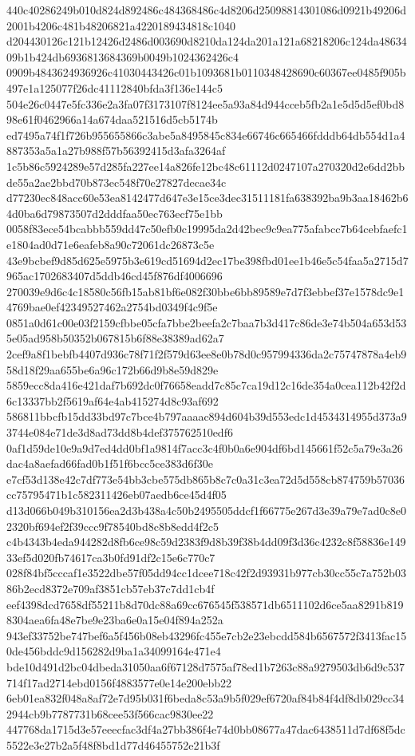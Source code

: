 \documentclass[11pt,a4paper]{article}
\begin{document}
{440c40286249b010d824d892486c484368486c4d8206d25098814301086d0921b49206d2001b4206c481b48206821a4220189434818c1040
d204430126c121b12426d2486d003690d8210da124da201a121a68218206c124da4863409b1b424db6936813684369b0049b1024362426c4
0909b4843624936926c41030443426c01b1093681b0110348428690c60367ee0485f905b497e1a125077f26dc41112840bfda3f136e144c5
504e26c0447e5fc336e2a3fa07f3173107f8124ee5a93a84d944cceb5fb2a1e5d5d5ef0bd898e61f0462966a14a674daa521516d5cb5174b
ed7495a74f1f726b955655866c3abe5a8495845c834e66746c665466fdddb64db554d1a4887353a5a1a27b988f57b56392415d3afa3264af
1c5b86c5924289e57d285fa227ee14a826fe12bc48c61112d0247107a270320d2e6dd2bbde55a2ae2bbd70b873ec548f70e27827decae34c
d77230ec848acc60e53ea8142477d647e3e15ce3dec31511181fa638392ba9b3aa18462b64d0ba6d79873507d2dddfaa50ec763ecf75e1bb
0058f83ece54bcabbb559dd47c50efb0c19995da2d42bec9c9ea775afabcc7b64cebfaefc1e1804ad0d71e6eafeb8a90c72061dc26873c5e
43e9bcbef9d85d625e5975b3e619cd51694d2ec17be398fbd01ee1b46e5c54faa5a2715d7965ac1702683407d5ddb46cd45f876df4006696
270039e9d6c4c18580c56fb15ab81bf6e082f30bbe6bb89589e7d7f3ebbef37e1578dc9e14769bae0ef42349527462a2754bd0349f4c9f5e
0851a0d61c00e03f2159cfbbe05cfa7bbe2beefa2c7baa7b3d417c86de3e74b504a653d535e05ad958b50352b067815b6f88e38389ad62a7
2cef9a8f1bebfb4407d936c78f71f2f579d63ee8e0b78d0c957994336da2c75747878a4eb958d18f29aa655be6a96c172b66d9b8e59d829e
5859ecc8da416e421daf7b692dc0f76658eadd7c85c7ca19d12c16de354a0cea112b42f2d6c13337bb2f5619af64e4ab415274d8c93af692
586811bbcfb15dd33bd97c7bce4b797aaaac894d604b39d553edc1d4534314955d373a93744e084e71de3d8ad73dd8b4def375762510edf6
0af1d59de10e9a9d7ed4dd0bf1a9814f7acc3c4f0b0a6e904df6bd145661f52c5a79e3a26dac4a8aefad66fad0b1f51f6bcc5ce383d6f30e
e7cf53d138e42c7df773e54bb3cbe575db865b8c7c0a31c3ea72d5d558cb874759b57036cc75795471b1c582311426eb07aedb6ce45d4f05
d13d066b049b310156ea2d3b438a4c50b2495505ddcf1f66775e267d3e39a79e7ad0c8e02320bf694ef2f39ccc9f78540bd8c8b8edd4f2c5
c4b4343b4eda944282d8fb6ce98c59d2383f9d8b39f38b4dd09f3d36c4232c8f58836e14933ef5d020fb74617ca3b0fd91df2c15e6c770c7
028f84bf5cccaf1e3522dbe57f05dd94cc1dcee718c42f2d93931b977cb30cc55c7a752b0386b2ecd8372e709af3851cb57eb37c7dd1cb4f
eef4398dcd7658df55211b8d70dc88a69cc676545f538571db6511102d6ce5aa8291b8198304aea6fa48e7be9e23ba6e0a15e04f894a252a
943ef33752be747bef6a5f456b08eb43296fc455e7cb2e23ebcdd584b6567572f3413fac150de456bddc9d156282d9ba1a34099164e471e4
bde10d491d2bc04dbeda31050aa6f67128d7575af78ed1b7263c88a9279503db6d9c537714f17ad2714ebd0156f4883577e0e14e200ebb22
6eb01ea832f048a8af72e7d95b031f6beda8c53a9b5f029ef6720af84b84f4df8db029cc342944cb9b7787731b68cee53f566cac9830ee22
447768da1715d3e57eeecfac3df4a27bb386f4e74d0bb08677a47dac6438511d7df68f5dc5522e3e27b2a5f48f8bd1d77d46455752e21b3f
}
\end{document}
